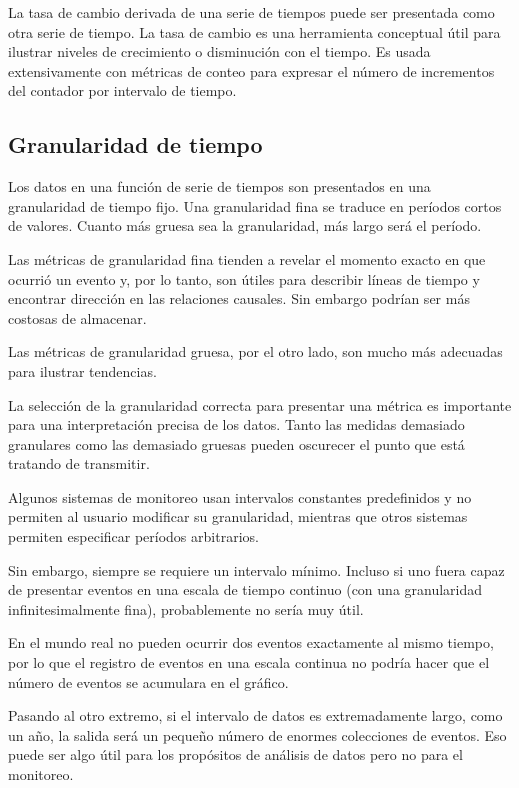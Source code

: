 La tasa de cambio derivada de una serie de tiempos puede ser presentada como
otra serie de tiempo. La tasa de cambio es una herramienta conceptual útil para
ilustrar niveles de crecimiento o disminución con el tiempo. Es usada
extensivamente con métricas de conteo para expresar el número de incrementos
del contador por intervalo de tiempo.

\subsection*{Granularidad de tiempo}
\label{granularidad_de_tiempo}

Los datos en una función de serie de tiempos son presentados en una
granularidad de tiempo fijo. Una granularidad fina se traduce en períodos
cortos de valores. Cuanto más gruesa sea la granularidad, más largo será el
período.

Las métricas de granularidad fina tienden a revelar el momento exacto en que
ocurrió un evento y, por lo tanto, son útiles para describir líneas de tiempo y
encontrar dirección en las relaciones causales. Sin embargo podrían ser más
costosas de almacenar.

Las métricas de granularidad gruesa, por el otro lado, son mucho más adecuadas
para ilustrar tendencias.

La selección de la granularidad correcta para presentar una métrica es
importante para una interpretación precisa de los datos. Tanto las medidas
demasiado granulares como las demasiado gruesas pueden oscurecer el punto que
está tratando de transmitir.

Algunos sistemas de monitoreo usan intervalos constantes predefinidos y no
permiten al usuario modificar su granularidad, mientras que otros sistemas
permiten especificar períodos arbitrarios.

Sin embargo, siempre se requiere un intervalo mínimo. Incluso si uno fuera
capaz de presentar eventos en una escala de tiempo continuo (con una
granularidad infinitesimalmente fina), probablemente no sería muy útil.

En el mundo real no pueden ocurrir dos eventos exactamente al mismo tiempo, por
lo que el registro de eventos en una escala continua no podría hacer que el
número de eventos se acumulara en el gráfico.

Pasando al otro extremo, si el intervalo de datos es extremadamente largo, como
un año, la salida será un pequeño número de enormes colecciones de eventos. Eso
puede ser algo útil para los propósitos de análisis de datos pero no para el
monitoreo.

